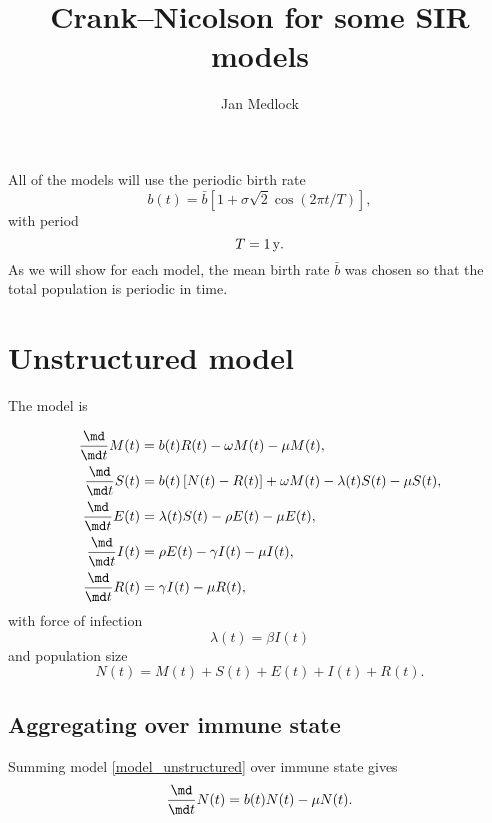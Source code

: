\documentclass{jpmarticle}
\title{Crank--Nicolson for some SIR models}
\author{Jan Medlock}
\let\subequationsorig\subequations%
\let\endsubequationsorig\endsubequations%
\renewenvironment{subequations}{
  \subequationsorig
  \renewcommand{\theequation}{\theparentequation.\arabic{equation}}
}{
  \endsubequationsorig
}
\begin{document}
\maketitle


All of the models will use the periodic birth rate
\begin{equation}
  b(t) = \bar{b} \left[
    1 + \sigma \sqrt{2} \cos\left(2 \pi t / T\right)
  \right],
\end{equation}
with period
\begin{equation}
  T = \unit[1]{y}.
\end{equation}
As we will show for each model, the mean birth rate $\bar{b}$
was chosen so that the total population is periodic in time.


\section{Unstructured model}

The model is
\begin{subequations}
  \label{model_unstructured}
  \begin{align}
    \frac{\md}{\md t} M(t) &=
    b(t) R(t) - \omega M(t) - \mu M(t),
    \\
    \frac{\md}{\md t} S(t) &=
    b(t) \left[N(t) - R(t)\right] + \omega M(t) - \lambda(t) S(t) - \mu S(t),
    \\
    \frac{\md}{\md t} E(t) &=
    \lambda(t) S(t) - \rho E(t) - \mu E(t),
    \\
    \frac{\md}{\md t} I(t) &=
    \rho E(t) - \gamma I(t) - \mu I(t),
    \\
    \frac{\md}{\md t} R(t) &=
    \gamma I(t) - \mu R(t),
  \end{align}
  with force of infection
  \begin{equation}
    \lambda(t) = \beta I(t)
  \end{equation}
  and population size
  \begin{equation}
    N(t) = M(t) + S(t) + E(t) + I(t) + R(t).
  \end{equation}
\end{subequations}


\subsection{Aggregating over immune state}

Summing model \eqref{model_unstructured} over immune state gives
\begin{equation}
  \label{model_unstructured_agg_state}
  \frac{\md}{\md t} N(t)
  = b(t) N(t) - \mu N(t).
\end{equation}
\end{document}
